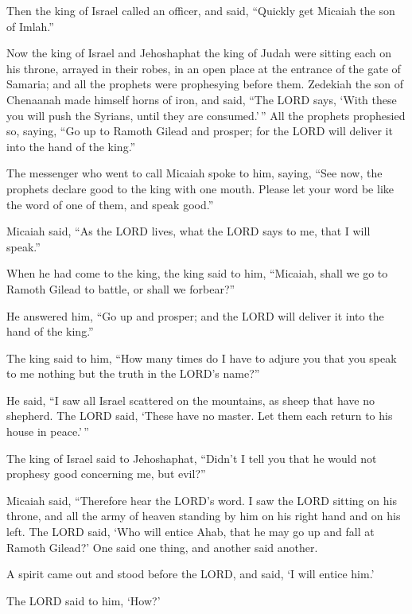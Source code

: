  Then the king of Israel called an officer, and said,
``Quickly get Micaiah the son of Imlah.''

 Now the king of Israel and Jehoshaphat the king of Judah
were sitting each on his throne, arrayed in their robes, in an open
place at the entrance of the gate of Samaria; and all the prophets were
prophesying before them.  Zedekiah the son of Chenaanah
made himself horns of iron, and said, ``The LORD says, `With these you
will push the Syrians, until they are consumed.'\,''  All
the prophets prophesied so, saying, ``Go up to Ramoth Gilead and
prosper; for the LORD will deliver it into the hand of the king.''

 The messenger who went to call Micaiah spoke to him,
saying, ``See now, the prophets declare good to the king with one mouth.
Please let your word be like the word of one of them, and speak good.''

 Micaiah said, ``As the LORD lives, what the LORD says to
me, that I will speak.''

 When he had come to the king, the king said to him,
``Micaiah, shall we go to Ramoth Gilead to battle, or shall we
forbear?''

He answered him, ``Go up and prosper; and the LORD will deliver it into
the hand of the king.''

 The king said to him, ``How many times do I have to adjure
you that you speak to me nothing but the truth in the LORD's name?''

 He said, ``I saw all Israel scattered on the mountains, as
sheep that have no shepherd. The LORD said, `These have no master. Let
them each return to his house in peace.'\,''

 The king of Israel said to Jehoshaphat, ``Didn't I tell
you that he would not prophesy good concerning me, but evil?''

 Micaiah said, ``Therefore hear the LORD's word. I saw the
LORD sitting on his throne, and all the army of heaven standing by him
on his right hand and on his left.  The LORD said, `Who
will entice Ahab, that he may go up and fall at Ramoth Gilead?' One said
one thing, and another said another.

 A spirit came out and stood before the LORD, and said, `I
will entice him.'

 The LORD said to him, `How?'

